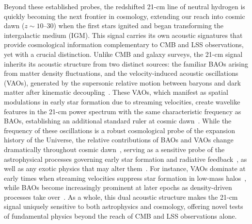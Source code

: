 Beyond these established probes, the redshifted 21-cm line of neutral hydrogen is quickly becoming the next frontier in cosmology, extending our reach into cosmic dawn ($z\sim10$--$30$) when the first stars ignited and began transforming the intergalactic medium (IGM). This signal carries its own acoustic signatures that provide cosmological information complementary to CMB and LSS observations, yet with a crucial distinction. Unlike CMB and galaxy surveys, the 21-cm signal inherits its acoustic structure from two distinct sources: the familiar BAOs arising from matter density fluctuations, and the velocity-induced acoustic oscillations (VAOs), generated by the supersonic relative motion between baryons and dark matter after kinematic decoupling~\citep{visbal12, mcquinn12, fialkov12, Fialkov:2013uwm, munoz19}. These VAOs, which manifest as spatial modulations in early star formation due to streaming velocities, create wavelike features in the 21-cm power spectrum with the same characteristic frequency as BAOs, establishing an additional standard ruler at cosmic dawn~\cite{munoz19b, Sarkar:2022mdz}. While the frequency of these oscillations is a robust cosmological probe of the expansion history of the Universe, the relative contributions of BAOs and VAOs change dramatically throughout cosmic dawn~\citep{cruz25},  serving as a sensitive probe of the astrophysical processes governing early star formation and radiative feedback~\citep{munoz20,Libanore:2023oxf,Zhang:2024pwv, verwohlt2024}, as well as any exotic physics that may alter them~\citep{Hotinli:2021vxg,Hotinli:2021xln, cruz24}. For instance, VAOs dominate at early times when streaming velocities suppress star formation in low-mass halos~\citep{mcquinn12, schauer19, kulkarni21}, while BAOs become increasingly prominent at later epochs as density-driven processes take over~\citep{cruz25}. As a whole, this dual acoustic structure makes the 21-cm signal uniquely sensitive to both astrophysics and cosmology, offering novel tests of fundamental physics beyond the reach of CMB and LSS observations alone.

